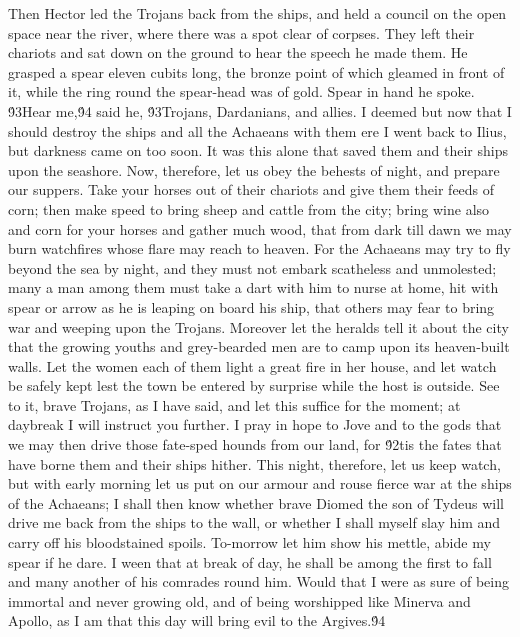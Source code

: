 {Then Hector led the Trojans back from the ships, and held a council on the open space near the river, where there was a spot clear of corpses. They left their chariots and sat down on the ground to hear the speech he made them. He grasped a spear eleven cubits long, the bronze point of which gleamed in front of it, while the ring round the spear-head was of gold. Spear in hand he spoke. \'93Hear me,\'94 said he, \'93Trojans, Dardanians, and allies. I deemed but now that I should destroy the ships and all the Achaeans with them ere I went back to Ilius, but darkness came on too soon. It was this alone that saved them and their ships upon the seashore. Now, therefore, let us obey the behests of night, and prepare our suppers. Take your horses out of their chariots and give them their feeds of corn; then make speed to bring sheep and cattle from the city; bring wine also and corn for your horses and gather much wood, that from dark till dawn we may burn watchfires whose flare may reach to heaven. For the Achaeans may try to fly beyond the sea by night, and they must not embark scatheless and unmolested; many a man among them must take a dart with him to nurse at home, hit with spear or arrow as he is leaping on board his ship, that others may fear to bring war and weeping upon the Trojans. Moreover let the heralds tell it about the city that the growing youths and grey-bearded men are to camp upon its heaven-built walls. Let the women each of them light a great fire in her house, and let watch be safely kept lest the town be entered by surprise while the host is outside. See to it, brave Trojans, as I have said, and let this suffice for the moment; at daybreak I will instruct you further. I pray in hope to Jove and to the gods that we may then drive those fate-sped hounds from our land, for \'92tis the fates that have borne them and their ships hither. This night, therefore, let us keep watch, but with early morning let us put on our armour and rouse fierce war at the ships of the Achaeans; I shall then know whether brave Diomed the son of Tydeus will drive me back from the ships to the wall, or whether I shall myself slay him and carry off his bloodstained spoils. To-morrow let him show his mettle, abide my spear if he dare. I ween that at break of day, he shall be among the first to fall and many another of his comrades round him. Would that I were as sure of being immortal and never growing old, and of being worshipped like Minerva and Apollo, as I am that this day will bring evil to the Argives.\'94\
}
